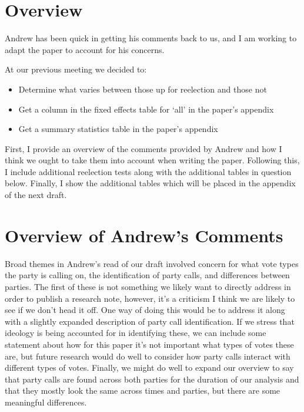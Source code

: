 \documentclass[12pt]{article}
\begin{document}
\section{Overview}

Andrew has been quick in getting his comments back to us, and I am working to adapt the paper to account for his concerns.

At our previous meeting we decided to:

\begin{itemize}
	\item Determine what varies between those up for reelection and those not
	
	\item Get a column in the fixed effects table for `all' in the paper's appendix
	
	\item Get a summary statistics table in the paper's appendix
\end{itemize}

First, I provide an overview of the comments provided by Andrew and how I think we ought to take them into account when writing the paper. Following this, I include additional reelection tests along with the additional tables in question below. Finally, I show the additional tables which will be placed in the appendix of the next draft.

\section{Overview of Andrew's Comments}

Broad themes in Andrew's read of our draft involved concern for what vote types the party is calling on, the identification of party calls, and differences between parties. The first of these is not something we likely want to directly address in order to publish a research note, however, it's a criticism I think we are likely to see if we don't head it off. One way of doing this would be to address it along with a slightly expanded description of party call identification. If we stress that ideology is being accounted for in identifying these, we can include some statement about how for this paper it's not important what types of votes these are, but future research would do well to consider how party calls interact with different types of votes. Finally, we might do well to expand our overview to say that party calls are found across both parties for the duration of our analysis and that they mostly look the same across times and parties, but there are some meaningful differences.
\end{document}
